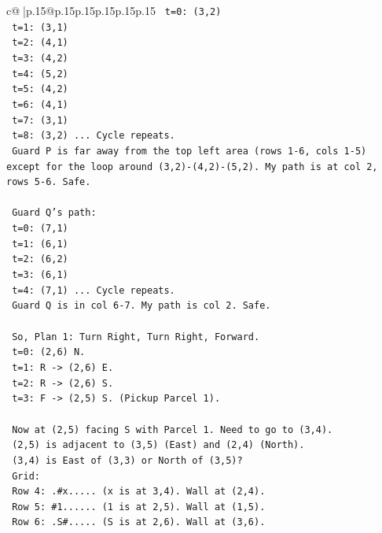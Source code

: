 \documentclass{article}
\begin{document}
{\begin{supertabular}{c@{$\;$}|p{.15\linewidth}@{}p{.15\linewidth}p{.15\linewidth}p{.15\linewidth}p{.15\linewidth}p{.15\linewidth}}
{{{\texttt{   t=0: (3,2)} \\
\texttt{   t=1: (3,1)} \\
\texttt{   t=2: (4,1)} \\
\texttt{   t=3: (4,2)} \\
\texttt{   t=4: (5,2)} \\
\texttt{   t=5: (4,2)} \\
\texttt{   t=6: (4,1)} \\
\texttt{   t=7: (3,1)} \\
\texttt{   t=8: (3,2) ... Cycle repeats.} \\
\texttt{   Guard P is far away from the top left area (rows 1{-}6, cols 1{-}5) except for the loop around (3,2){-}(4,2){-}(5,2). My path is at col 2, rows 5{-}6. Safe.} \\
\\ 
\texttt{   Guard Q's path:} \\
\texttt{   t=0: (7,1)} \\
\texttt{   t=1: (6,1)} \\
\texttt{   t=2: (6,2)} \\
\texttt{   t=3: (6,1)} \\
\texttt{   t=4: (7,1) ... Cycle repeats.} \\
\texttt{   Guard Q is in col 6{-}7. My path is col 2. Safe.} \\
\\ 
\texttt{   So, Plan 1: Turn Right, Turn Right, Forward.} \\
\texttt{   t=0: (2,6) N.} \\
\texttt{   t=1: R {-}> (2,6) E.} \\
\texttt{   t=2: R {-}> (2,6) S.} \\
\texttt{   t=3: F {-}> (2,5) S. (Pickup Parcel 1).} \\
\\ 
\texttt{   Now at (2,5) facing S with Parcel 1. Need to go to (3,4).} \\
\texttt{   (2,5) is adjacent to (3,5) (East) and (2,4) (North).} \\
\texttt{   (3,4) is East of (3,3) or North of (3,5)?} \\
\texttt{   Grid:} \\
\texttt{   Row 4: .\#x..... (x is at 3,4). Wall at (2,4).} \\
\texttt{   Row 5: \#1...... (1 is at 2,5). Wall at (1,5).} \\
\texttt{   Row 6: .S\#..... (S is at 2,6). Wall at (3,6).} \\
\\ 
}}}
\end{supertabular}}
\end{document}
